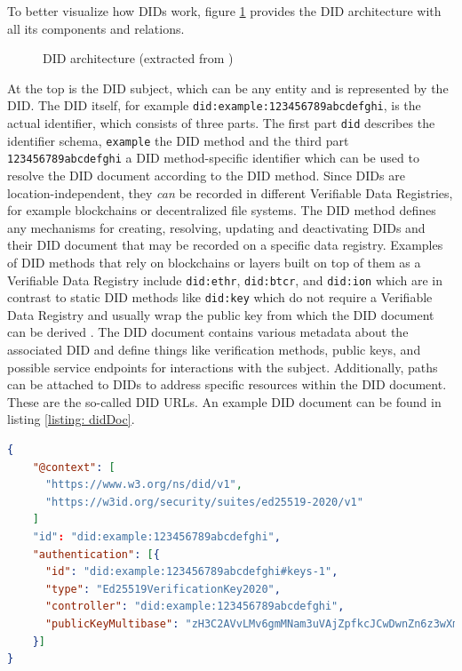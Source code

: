         To better visualize how \acp{DID} work, figure \ref{figure: didArchitecture} provides the \ac{DID} architecture with all its components and relations.
        
        \begin{figure}[ht]
    	    \centering
    	    \makebox[\textwidth]{}
            \caption[\ac{DID} architecture]{\ac{DID} architecture (extracted from \cite{sporny_decentralized_2021})}
            \label{figure: didArchitecture}
        \end{figure}
        
        At the top is the \ac{DID} subject, which can be any entity and is represented by the \ac{DID}. The \ac{DID} itself, for example \texttt{did:example:123456789abcdefghi}, is the actual identifier, which consists of three parts. The first part \texttt{did} describes the identifier schema, \texttt{example} the \ac{DID} method and the third part \texttt{123456789abcdefghi} a \ac{DID} method-specific identifier which can be used to resolve the \ac{DID} document according to the \ac{DID} method. Since \acp{DID} are location-independent, they \textit{can} be recorded in different Verifiable Data Registries, for example blockchains or decentralized file systems. The \ac{DID} method defines any mechanisms for creating, resolving, updating and deactivating \acp{DID} and their \ac{DID} document that may be recorded on a specific data registry. Examples of \ac{DID} methods that rely on blockchains or layers built on top of them as a Verifiable Data Registry include \texttt{did:ethr}, \texttt{did:btcr}, and \texttt{did:ion} which are in contrast to static \ac{DID} methods like \texttt{did:key} which do not require a Verifiable Data Registry and usually wrap the public key from which the DID document can be derived \cite[p. 171]{preukschat_self-sovereign_2021}. The \ac{DID} document contains various metadata about the associated \ac{DID} and define things like verification methods, public keys, and possible service endpoints for interactions with the subject. Additionally, paths can be attached to \acp{DID} to address specific resources within the \ac{DID} document. These are the so-called \ac{DID} URLs. An example \ac{DID} document can be found in listing \ref{listing: didDoc}. \cite{sporny_decentralized_2021}
        \newline
        
        \begin{lstlisting}[language=json, caption={[\ac{DID} document example]\ac{DID} document example extracted from \cite{sporny_decentralized_2021}}, captionpos=b, label={listing: didDoc}]
{
    "@context": [
      "https://www.w3.org/ns/did/v1",
      "https://w3id.org/security/suites/ed25519-2020/v1"
    ]
    "id": "did:example:123456789abcdefghi",
    "authentication": [{
      "id": "did:example:123456789abcdefghi#keys-1",
      "type": "Ed25519VerificationKey2020",
      "controller": "did:example:123456789abcdefghi",
      "publicKeyMultibase": "zH3C2AVvLMv6gmMNam3uVAjZpfkcJCwDwnZn6z3wXmqPV"
    }]
}\end{lstlisting}
        
